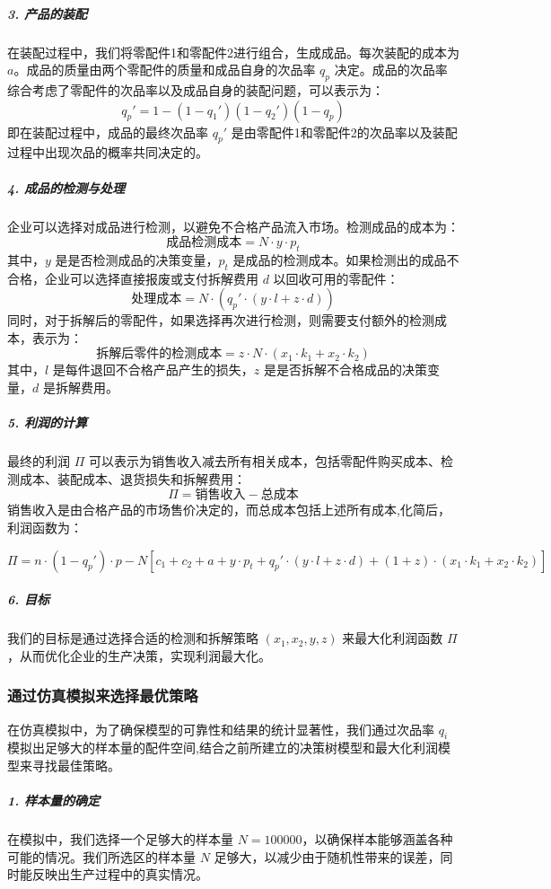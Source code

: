 \documentclass[utf8]{ctexart} %
\begin{document}
		\subparagraph{3. 产品的装配}
		
		在装配过程中，我们将零配件1和零配件2进行组合，生成成品。每次装配的成本为 $a$。成品的质量由两个零配件的质量和成品自身的次品率 $q_p$ 决定。成品的次品率综合考虑了零配件的次品率以及成品自身的装配问题，可以表示为：
		\[
		q_p' = 1 - (1 - q_1')(1 - q_2')(1 - q_p)
		\]
		即在装配过程中，成品的最终次品率 $q_p'$ 是由零配件1和零配件2的次品率以及装配过程中出现次品的概率共同决定的。
		
		\subparagraph{4. 成品的检测与处理}
		
		企业可以选择对成品进行检测，以避免不合格产品流入市场。检测成品的成本为：
		\[
		\text{成品检测成本} = N \cdot y \cdot p_t
		\]
		其中，$y$ 是是否检测成品的决策变量，$p_t$ 是成品的检测成本。如果检测出的成品不合格，企业可以选择直接报废或支付拆解费用 $d$ 以回收可用的零配件：
		\[
		\text{处理成本} = N \cdot (q_p' \cdot (y \cdot l + z \cdot d))
		\]
		同时，对于拆解后的零配件，如果选择再次进行检测，则需要支付额外的检测成本，表示为：
		\[
		\text{拆解后零件的检测成本} = z \cdot N \cdot (x_1 \cdot k_1 + x_2 \cdot k_2)
		\]
		其中，$l$ 是每件退回不合格产品产生的损失，$z$ 是是否拆解不合格成品的决策变量，$d$ 是拆解费用。
		
		\subparagraph{5. 利润的计算}
		
		最终的利润 $\Pi$ 可以表示为销售收入减去所有相关成本，包括零配件购买成本、检测成本、装配成本、退货损失和拆解费用：
		\[
		\Pi = \text{销售收入} - \text{总成本}
		\]
		销售收入是由合格产品的市场售价决定的，而总成本包括上述所有成本,化简后，利润函数为：
		
		\[
		\Pi = n \cdot (1 - q_p') \cdot p - N \left[ c_1 + c_2 + a + y \cdot p_t + q_p' \cdot (y \cdot l + z \cdot d) + (1 + z) \cdot (x_1 \cdot k_1 + x_2 \cdot k_2) \right]
		\]
		
		\subparagraph{6. 目标}
		
		我们的目标是通过选择合适的检测和拆解策略 $(x_1, x_2, y, z)$ 来最大化利润函数 $\Pi$，从而优化企业的生产决策，实现利润最大化。
		
		
		\subsubsection{通过仿真模拟来选择最优策略}
		
		在仿真模拟中，为了确保模型的可靠性和结果的统计显著性，我们通过次品率 \( q_i \) 模拟出足够大的样本量的配件空间,结合之前所建立的决策树模型和最大化利润模型来寻找最佳策略。
		\subparagraph{1. 样本量的确定}\label{sample_size}
		
		在模拟中，我们选择一个足够大的样本量 $N=100000$，以确保样本能够涵盖各种可能的情况。我们所选区的样本量 $N$ 足够大，以减少由于随机性带来的误差，同时能反映出生产过程中的真实情况。
		
\end{document}
